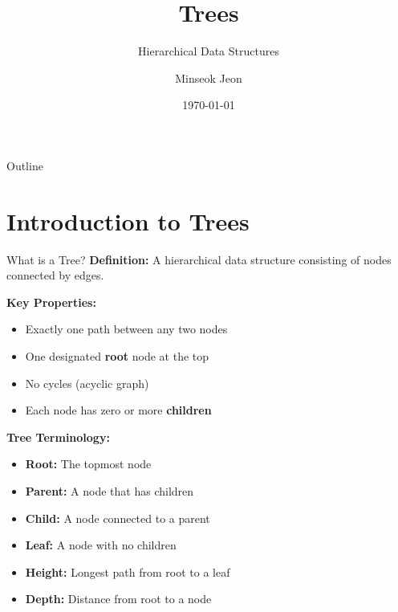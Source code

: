 \documentclass[aspectratio=169]{beamer}
\title{Trees}
\subtitle{Hierarchical Data Structures}
\author{Minseok Jeon}
\institute{DGIST}
\date{\today}
\begin{document}
\begin{frame}
  \titlepage
\end{frame}

\begin{frame}{Outline}
  \tableofcontents
\end{frame}

\section{Introduction to Trees}

\begin{frame}{What is a Tree?}
  \textbf{Definition:} A hierarchical data structure consisting of nodes connected by edges.

  \vspace{0.3cm}
  \textbf{Key Properties:}
  \begin{itemize}
    \item Exactly one path between any two nodes
    \item One designated \textbf{root} node at the top
    \item No cycles (acyclic graph)
    \item Each node has zero or more \textbf{children}
  \end{itemize}

  \vspace{0.3cm}
  \textbf{Tree Terminology:}
  \begin{itemize}
    \item \textbf{Root:} The topmost node
    \item \textbf{Parent:} A node that has children
    \item \textbf{Child:} A node connected to a parent
    \item \textbf{Leaf:} A node with no children
    \item \textbf{Height:} Longest path from root to a leaf
    \item \textbf{Depth:} Distance from root to a node
  \end{itemize}
\end{frame}
\end{document}

